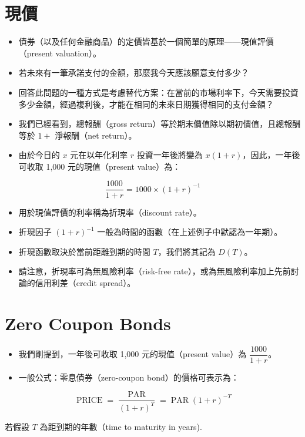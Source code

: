 \documentclass[letterpaper]{article}
\begin{document}
\section*{現價}
\begin{itemize}
	\item 債券（以及任何金融商品）的定價皆基於一個簡單的原理——現值評價（present valuation）。
	\item 若未來有一筆承諾支付的金額，那麼我今天應該願意支付多少？
	\item 回答此問題的一種方式是考慮替代方案：在當前的市場利率下，今天需要投資多少金額，經過複利後，才能在相同的未來日期獲得相同的支付金額？

	\item 我們已經看到，總報酬（gross return）等於期末價值除以期初價值，且總報酬等於 \(1+\) 淨報酬（net return）。
	\item 由於今日的 \(x\) 元在以年化利率 \(r\) 投資一年後將變為 \(x(1+r)\)，因此，一年後可收取 1,000 元的現值（present value）為：
\end{itemize}


$$
\frac{1000}{1+r}=1000 \times(1+r)^{-1}
$$

\begin{itemize}
	\item 用於現值評價的利率稱為折現率（discount rate）。
	\item 折現因子 \((1 + r)^{-1}\) 一般為時間的函數（在上述例子中默認為一年期）。
	\item 折現函數取決於當前距離到期的時間 \(T\)，我們將其記為 \(D(T)\)。
	\item 請注意，折現率可為無風險利率（risk-free rate），或為無風險利率加上先前討論的信用利差（credit spread）。
\end{itemize}

\section*{Zero Coupon Bonds}
\begin{itemize}
	\item 我們剛提到，一年後可收取 1,000 元的現值（present value）為 \(\dfrac{1000}{1 + r}\)。
	\item 一般公式：零息債券（zero-coupon bond）的價格可表示為：
\end{itemize}

$$
\operatorname{PRICE}=\frac{\operatorname{PAR}}{(1+r)^{T}}=\operatorname{PAR}(1+r)^{-T}
$$

若假設 \( T \) 為距到期的年數（time to maturity in years).
\end{document}
